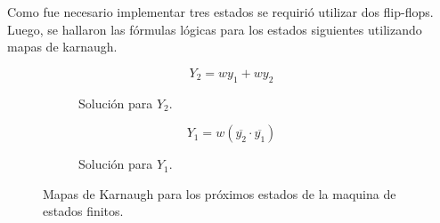 Como fue necesario implementar tres estados se requirió utilizar dos flip-flops. Luego, se hallaron las fórmulas lógicas para los estados siguientes utilizando mapas de karnaugh.

\begin{figure}[H]
\begin{subfigure}{0.49\textwidth}
\begin{centering}
    \begin{Karnaughvuit}
        
        
    \end{Karnaughvuit}
\par\end{centering}
\begin{equation*}
Y_2 = wy_1+wy_2
\end{equation*}
\begin{table}[H]
\caption{Solución para $Y_2.$}
\label{mapa:Y2}
\end{table}
\end{subfigure}
\begin{subfigure}{0.49\textwidth}
\begin{centering}
    \begin{Karnaughvuit}
        
        
    \end{Karnaughvuit}
\par\end{centering}
\begin{equation*}
Y_1 = w(\overline{y_2}\cdot \overline{y_1})
\end{equation*}
\begin{table}[H]
\caption{Solución para $Y_1.$}
\label{mapa:Y1}
\end{table}
\end{subfigure}
\caption{Mapas de Karnaugh para los próximos estados de la maquina de estados finitos.}
\end{figure}

